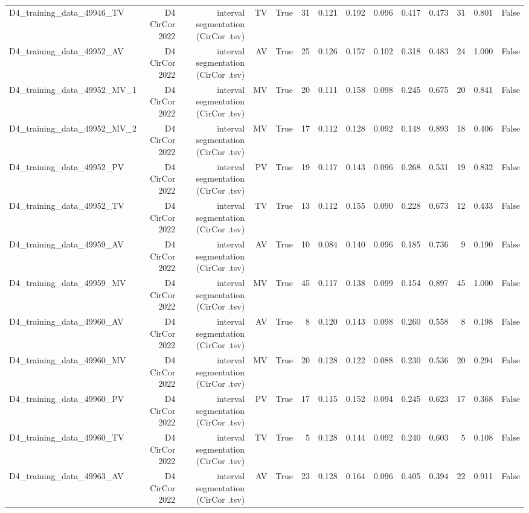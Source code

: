 \begin{table}[htbp]
\begin{tabular}{lrrrrrrrrrrrrr}
    D4\_training\_data\_49946\_TV & D4 CirCor 2022 & interval segmentation (CirCor .tsv) & TV & True & 31 & 0.121 & 0.192 & 0.096 & 0.417 & 0.473 & 31 & 0.801 & False \\
    D4\_training\_data\_49952\_AV & D4 CirCor 2022 & interval segmentation (CirCor .tsv) & AV & True & 25 & 0.126 & 0.157 & 0.102 & 0.318 & 0.483 & 24 & 1.000 & False \\
    D4\_training\_data\_49952\_MV\_1 & D4 CirCor 2022 & interval segmentation (CirCor .tsv) & MV & True & 20 & 0.111 & 0.158 & 0.098 & 0.245 & 0.675 & 20 & 0.841 & False \\
    D4\_training\_data\_49952\_MV\_2 & D4 CirCor 2022 & interval segmentation (CirCor .tsv) & MV & True & 17 & 0.112 & 0.128 & 0.092 & 0.148 & 0.893 & 18 & 0.406 & False \\
    D4\_training\_data\_49952\_PV & D4 CirCor 2022 & interval segmentation (CirCor .tsv) & PV & True & 19 & 0.117 & 0.143 & 0.096 & 0.268 & 0.531 & 19 & 0.832 & False \\
    D4\_training\_data\_49952\_TV & D4 CirCor 2022 & interval segmentation (CirCor .tsv) & TV & True & 13 & 0.112 & 0.155 & 0.090 & 0.228 & 0.673 & 12 & 0.433 & False \\
    D4\_training\_data\_49959\_AV & D4 CirCor 2022 & interval segmentation (CirCor .tsv) & AV & True & 10 & 0.084 & 0.140 & 0.096 & 0.185 & 0.736 & 9 & 0.190 & False \\
    D4\_training\_data\_49959\_MV & D4 CirCor 2022 & interval segmentation (CirCor .tsv) & MV & True & 45 & 0.117 & 0.138 & 0.099 & 0.154 & 0.897 & 45 & 1.000 & False \\
    D4\_training\_data\_49960\_AV & D4 CirCor 2022 & interval segmentation (CirCor .tsv) & AV & True & 8 & 0.120 & 0.143 & 0.098 & 0.260 & 0.558 & 8 & 0.198 & False \\
    D4\_training\_data\_49960\_MV & D4 CirCor 2022 & interval segmentation (CirCor .tsv) & MV & True & 20 & 0.128 & 0.122 & 0.088 & 0.230 & 0.536 & 20 & 0.294 & False \\
    D4\_training\_data\_49960\_PV & D4 CirCor 2022 & interval segmentation (CirCor .tsv) & PV & True & 17 & 0.115 & 0.152 & 0.094 & 0.245 & 0.623 & 17 & 0.368 & False \\
    D4\_training\_data\_49960\_TV & D4 CirCor 2022 & interval segmentation (CirCor .tsv) & TV & True & 5 & 0.128 & 0.144 & 0.092 & 0.240 & 0.603 & 5 & 0.108 & False \\
    D4\_training\_data\_49963\_AV & D4 CirCor 2022 & interval segmentation (CirCor .tsv) & AV & True & 23 & 0.128 & 0.164 & 0.096 & 0.405 & 0.394 & 22 & 0.911 & False \\

\end{tabular}
\end{table}
